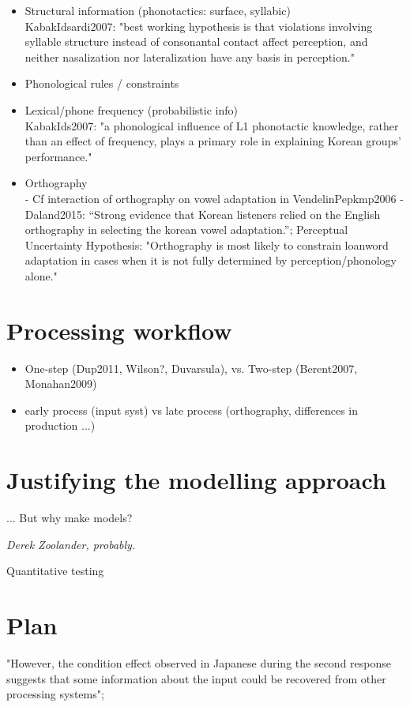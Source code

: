 \begin{itemize}
\item Structural information (phonotactics: surface, syllabic) \\
  KabakIdsardi2007: "best working hypothesis is that violations involving syllable structure instead of consonantal contact affect perception, and neither nasalization nor lateralization have any basis in perception."
  \item Phonological rules / constraints
  \item Lexical/phone frequency (probabilistic info) \\
    KabakIds2007: "a phonological influence of L1 phonotactic knowledge, rather than an effect of frequency, plays a primary role in explaining Korean groups’ performance."

  \item Orthography \\
    - Cf interaction of orthography on vowel adaptation in VendelinPepkmp2006
    - Daland2015: ``Strong evidence that Korean listeners relied on the English orthography in selecting the korean vowel adaptation.''; Perceptual Uncertainty Hypothesis: "Orthography is most likely to constrain loanword adaptation in cases when it is not fully determined by perception/phonology alone."
    
\end{itemize}

\section{Processing workflow}
\begin{itemize}
    \item One-step (Dup2011, Wilson?, Duvarsula), vs. Two-step (Berent2007, Monahan2009)
    \item early process (input syst) vs late process (orthography, differences in production ...)
    \end{itemize}
    
\section{Justifying the modelling approach}
\epigraph{... But why make models?}{\textit{Derek Zoolander, probably.}}
Quantitative testing $~$

\section{Plan}

"However, the condition effect observed in Japanese during the second response suggests that some information about the input could be recovered from other processing systems";